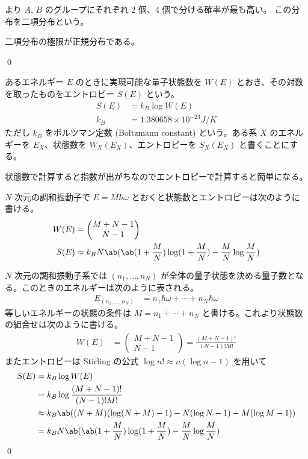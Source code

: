 \documentclass[uplatex,diffipdfmx,a4paper,11pt]{jlreq}
\makeatletter
\newcommand\mqty[1]{\begin{pmatrix}#1\end{pmatrix}}
\theoremstyle{definition}
\renewenvironment{proof}[1][\proofname]{\par
  \normalfont
  \topsep6\p@\@plus6\p@ \trivlist
  \item[\hskip\labelsep{\bfseries #1}\@addpunct{\bfseries}]\ignorespaces\quad\par
}{%
  \qed\endtrivlist\@endpefalse
}
\renewcommand\proofname{証明}
\makeatother
\begin{document}
より $A$, $B$ のグループにそれぞれ 2 個、4 個で分ける確率が最も高い。
この分布を二項分布という。

\begin{proposition}
  二項分布の極限が正規分布である。
\end{proposition}
\begin{proof}
\end{proof}

\begin{definition}
  あるエネルギー $E$ のときに実現可能な量子状態数を $W(E)$ とおき、その対数を取ったものをエントロピー $S(E)$ という。
  \begin{align}
    S(E) & = k_B\log W(E)                     \\
    k_B  & = 1.380658\times 10^{-23} \si{J/K}
  \end{align}
  ただし $k_B$ をボルツマン定数 (Boltzmann constant) という。ある系 $X$ のエネルギーを $E_X$、状態数を $W_X(E_X)$、エントロピーを $S_X(E_X)$ と書くことにする。
\end{definition}
状態数で計算すると指数が出がちなのでエントロピーで計算すると簡単になる。

\begin{theorem}
  $N$ 次元の調和振動子で $E = M\hbar\omega$ とおくと状態数とエントロピーは次のように書ける。
  \begin{align}
    W(E) & = \mqty{M + N - 1                                                                       \\ N - 1} \\
    S(E) & \approx k_BN\ab(\ab(1 + \frac{M}{N})\log(1 + \frac{M}{N}) - \frac{M}{N}\log\frac{M}{N})
  \end{align}
\end{theorem}
\begin{proof}
  $N$ 次元の調和振動子系では $(n_1,\ldots,n_N)$ が全体の量子状態を決める量子数となる。このときのエネルギーは次のように表される。
  \begin{align}
    E_{(n_1,\ldots,n_N)} & = n_1\hbar\omega + \cdots + n_N\hbar\omega
  \end{align}
  等しいエネルギーの状態の条件は $M = n_1 + \cdots + n_N$ と書ける。これより状態数の組合せは次のように書ける。
  \begin{align}
    W(E) & = \mqty{M + N - 1 \\ N - 1} = \frac{(M + N - 1)!}{(N - 1)!M!}
  \end{align}
  またエントロピーは Stirling の公式 $\log n! \approx n(\log n - 1)$ を用いて
  \begin{align}
    S(E) & = k_B\log W(E)                                                                    \\
         & = k_B\log\frac{(M + N - 1)!}{(N - 1)!M!}                                          \\
         & \approx k_B\ab((N + M)(\log(N + M) - 1) - N(\log N - 1) - M(\log M - 1))          \\
         & = k_BN\ab(\ab(1 + \frac{M}{N})\log(1 + \frac{M}{N}) - \frac{M}{N}\log\frac{M}{N})
  \end{align}
\end{proof}
\end{document}
